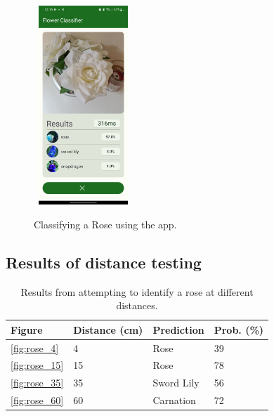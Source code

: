 \documentclass[12pt,a4paper]{report}
\begin{document}
\begin{figure}[h]\
    \includegraphics[width=0.3\textwidth]{rose.jpg}
    \caption{Classifying a Rose using the app.}
    \label{fig:rose}
\end{figure}

\clearpage


\subsection{Results of distance testing}
\label{subsec:distance}

\begin{table}[h!]
    \begin{tabular}{ |l|l|l|l| }
        \hline
        Figure & Distance (cm) & Prediction & Prob. (\%)\\
        \hline
        \ref{fig:rose_4} & 4 & Rose & 39 \\
        \hline
        \ref{fig:rose_15} & 15 & Rose & 78 \\
        \hline
        \ref{fig:rose_35} & 35 & Sword Lily & 56 \\
        \hline
        \ref{fig:rose_60} & 60 & Carnation & 72 \\ 
        \hline
    \end{tabular}
    \caption{Results from attempting to identify a rose at different distances.}
    \label{table:distance}
\end{table}
\end{document}
